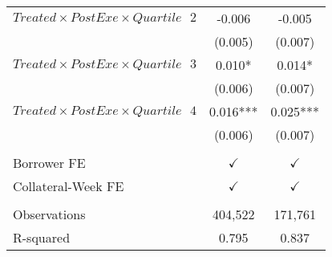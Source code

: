 \begin{table}[ht!]
\begin{tabular*}{\linewidth}{@{\extracolsep{\fill}}lcc }
    $Treated \times PostExe \times Quartile\text{ }2$ & -0.006 & -0.005 \\
          & (0.005) & (0.007) \\[2pt]
    $Treated \times PostExe \times Quartile\text{ }3$ & 0.010* & 0.014* \\
          & (0.006) & (0.007) \\[2pt]
    $Treated \times PostExe \times Quartile\text{ }4$ & 0.016*** & 0.025*** \\
          & (0.006) & (0.007) \\
          & & \\
    Borrower FE &    $\checkmark$     & $\checkmark$   \\
    Collateral-Week FE &  $\checkmark$       & $\checkmark$   \\
              & & \\
    Observations & 404,522 & 171,761 \\
    R-squared & 0.795 & 0.837 \\
    \bottomrule
          \end{tabular*} 



\end{table}%


